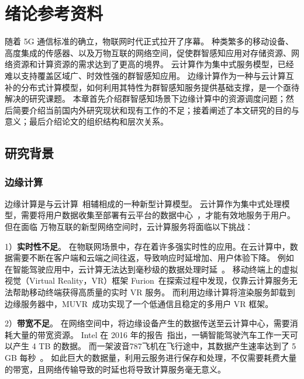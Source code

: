 \chapter{绪论参考资料}


随着 5G 通信标准的确立，物联网时代正式拉开了序幕。
种类繁多的移动设备、高度集成的传感器、以及万物互联的网络空间，促使群智感知应用对存储资源、网络资源和计算资源的需求达到了更高的境界。
云计算作为集中式服务模型，已经难以支持覆盖区域广、时效性强的群智感知应用。
边缘计算作为一种与云计算互补的分布式计算模型，如何利用其特性为群智感知服务提供基础支撑，是一个亟待解决的研究课题。
本章首先介绍群智感知场景下边缘计算中的资源调度问题；然后简要介绍当前国内外研究现状和现有工作的不足；接着阐述了本文研究的目的与意义；最后介绍论文的组织结构和层次关系。

\section{研究背景}

\subsection{边缘计算}
边缘计算是与云计算~\cite{DBLP:journals/cacm/ArmbrustFGJKKLPRSZ10}相辅相成的一种新型计算模型。
云计算作为集中式处理模型，需要将用户数据收集至部署有云平台的数据中心~\cite{DBLP:conf/icdcs/Montresor16}，才能有效地服务于用户。
但在面临 万物互联的新型网络空间时，云计算服务将面临以下挑战：

1）\textbf{实时性不足}。
在物联网场景中，存在着许多强实时性的应用。在云计算中，数据需要不断在客户端和云端之间往返，导致响应时延增加、用户体验下降。
例如在智能驾驶应用中，云计算无法达到毫秒级的数据处理时延~\cite{DBLP:conf/cvpr/GeigerLU12}。
移动终端上的虚拟视觉（Virtual Reality，VR）框架 Furion~\cite{DBLP:conf/mobicom/LaiHCSD17}在探索过程中发现，仅靠云计算服务无法帮助移动终端获得高质量的实时 VR 服务。
而利用边缘计算将渲染服务卸载到边缘服务器中，MUVR~\cite{DBLP:conf/edge/LiG18}成功实现了一个低通信且稳定的多用户 VR 框架。

2）\textbf{带宽不足}。
在网络空间中，将边缘设备产生的数据传送至云计算中心，需要消耗大量的带宽资源。
Intel 在 2016 年的报告~\cite{DBLP:journals/micro/KatoTINTH15}指出，一辆智能驾驶汽车工作一天可以产生 4 TB 的数据。
而一架波音787飞机在飞行途中，其数据产生速率达到了 5 GB 每秒~\cite{JCRD/shi17}。
如此巨大的数据量，利用云服务进行保存和处理，不仅需要耗费大量的带宽，且网络传输导致的时延也将导致计算服务毫无意义。

